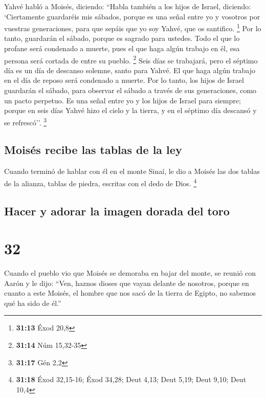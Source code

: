  Yahvé habló a Moisés, diciendo:  ``Habla
también a los hijos de Israel, diciendo: `Ciertamente guardaréis mis
sábados, porque es una señal entre yo y vosotros por vuestras
generaciones, para que sepáis que yo soy Yahvé, que os santifico.
\footnote{\textbf{31:13} Éxod 20,8}  Por lo tanto,
guardarán el sábado, porque es sagrado para ustedes. Todo el que lo
profane será condenado a muerte, pues el que haga algún trabajo en él,
esa persona será cortada de entre su pueblo. \footnote{\textbf{31:14}
  Núm 15,32-35}  Seis días se trabajará, pero el séptimo
día es un día de descanso solemne, santo para Yahvé. El que haga algún
trabajo en el día de reposo será condenado a muerte.  Por
lo tanto, los hijos de Israel guardarán el sábado, para observar el
sábado a través de sus generaciones, como un pacto perpetuo.
 Es una señal entre yo y los hijos de Israel para
siempre; porque en seis días Yahvé hizo el cielo y la tierra, y en el
séptimo día descansó y se refrescó''. \footnote{\textbf{31:17} Gén 2,2}

\hypertarget{moisuxe9s-recibe-las-tablas-de-la-ley}{%
\subsection{Moisés recibe las tablas de la
ley}\label{moisuxe9s-recibe-las-tablas-de-la-ley}}

 Cuando terminó de hablar con él en el monte Sinaí, le
dio a Moisés las dos tablas de la alianza, tablas de piedra, escritas
con el dedo de Dios. \footnote{\textbf{31:18} Éxod 32,15-16; Éxod 34,28;
  Deut 4,13; Deut 5,19; Deut 9,10; Deut 10,4}

\hypertarget{hacer-y-adorar-la-imagen-dorada-del-toro}{%
\subsection{Hacer y adorar la imagen dorada del
toro}\label{hacer-y-adorar-la-imagen-dorada-del-toro}}

\hypertarget{section-31}{%
\section{32}\label{section-31}}

 Cuando el pueblo vio que Moisés se demoraba en bajar del
monte, se reunió con Aarón y le dijo: ``Ven, haznos dioses que vayan
delante de nosotros, porque en cuanto a este Moisés, el hombre que nos
sacó de la tierra de Egipto, no sabemos qué ha sido de él.''

